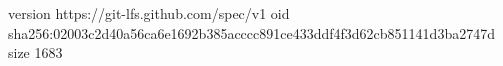 version https://git-lfs.github.com/spec/v1
oid sha256:02003c2d40a56ca6e1692b385acccc891ce433ddf4f3d62cb851141d3ba2747d
size 1683
